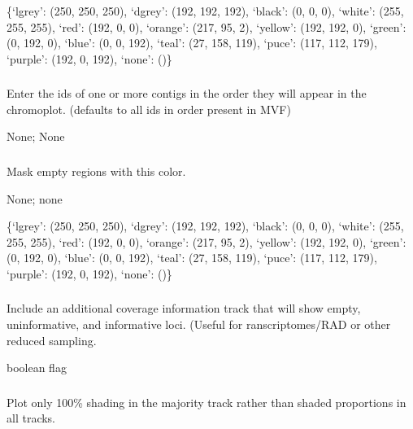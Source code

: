 \documentclass[letterpaper,11pt,english]{sphinxmanual}
\begin{document}
 \{‘lgrey’: (250, 250, 250), ‘dgrey’: (192, 192, 192), ‘black’: (0, 0, 0), ‘white’: (255, 255, 255), ‘red’: (192, 0, 0), ‘orange’: (217, 95, 2), ‘yellow’: (192, 192, 0), ‘green’: (0, 192, 0), ‘blue’: (0, 0, 192), ‘teal’: (27, 158, 119), ‘puce’: (117, 112, 179), ‘purple’: (192, 0, 192), ‘none’: ()\}


\subsubsection{}
\label{\detokenize{prog_desc:id127}}
 Enter the ids of one or more contigs in the order they will appear in the chromoplot. (defaults to all ids in order present in MVF)

 None;  None


\subsubsection{}
\label{\detokenize{prog_desc:empty-mask-emptymask}}
 Mask empty regions with this color.

 None;  none

 \{‘lgrey’: (250, 250, 250), ‘dgrey’: (192, 192, 192), ‘black’: (0, 0, 0), ‘white’: (255, 255, 255), ‘red’: (192, 0, 0), ‘orange’: (217, 95, 2), ‘yellow’: (192, 192, 0), ‘green’: (0, 192, 0), ‘blue’: (0, 0, 192), ‘teal’: (27, 158, 119), ‘puce’: (117, 112, 179), ‘purple’: (192, 0, 192), ‘none’: ()\}


\subsubsection{}
\label{\detokenize{prog_desc:info-track-infotrack}}
 Include an additional coverage information track that will show empty, uninformative, and informative loci. (Useful for ranscriptomes/RAD or other reduced sampling.

 boolean flag


\subsubsection{}
\label{\detokenize{prog_desc:majority}}
 Plot only 100\% shading in the majority track  rather than shaded proportions in all tracks.
\end{document}
